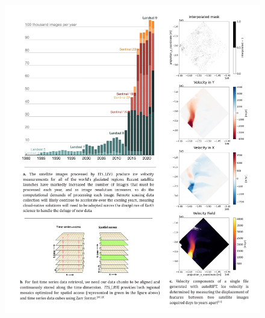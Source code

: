 \documentclass[
  super,
  preprint,
  3p,
  twocolumn]{elsarticle}
\begin{document}
\newpage{}

\begin{figure}

{\centering 

\includegraphics{figures/figure-1-consolidated.jpg}

}

\caption{\label{fig-1}\citep[See][]{Miles2023-yj, Fouilloux2018-jw, Scambos1992-jz}}

\end{figure}
\end{document}
